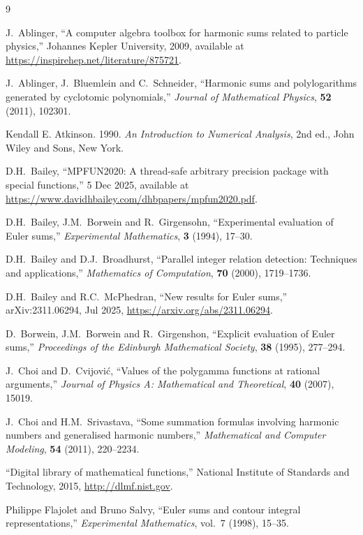 \documentclass{article}
\theoremstyle{definition}
\begin{document}
\begin{thebibliography}{9}

 J.~Ablinger, ``A computer algebra toolbox for harmonic sums related to particle physics,'' Johannes Kepler University, 2009, available at \url{https://inspirehep.net/literature/875721}.

 J.~Ablinger, J.~Bluemlein and C.~Schneider, ``Harmonic sums and polylogarithms generated by cyclotomic polynomials,'' \emph{Journal of Mathematical Physics}, {\bf 52} (2011), 102301.

 Kendall E. Atkinson. 1990. \emph{An Introduction to Numerical Analysis}, 2nd ed., John Wiley and Sons, New York.

D.H.~Bailey, ``MPFUN2020: A thread-safe arbitrary precision package with special functions,'' 5 Dec 2025, available at \url{https://www.davidhbailey.com/dhbpapers/mpfun2020.pdf}.

D.H.~Bailey, J.M.~Borwein and R.~Girgensohn, ``Experimental evaluation of Euler sums,'' \emph{Experimental Mathematics}, {\bf 3} (1994), 17--30.

 D.H.~Bailey and D.J.~Broadhurst, ``Parallel integer relation detection: Techniques and applications,'' \emph{Mathematics of Computation}, {\bf 70} (2000), 1719--1736.

D.H.~Bailey and R.C.~McPhedran, ``New results for Euler sums,'' arXiv:2311.06294, Jul 2025, \url{https://arxiv.org/abs/2311.06294}.

D.~Borwein, J.M.~Borwein and R.~Girgenshon, ``Explicit evaluation of Euler sums,'' {\em Proceedings of the Edinburgh Mathematical Society}, {\bf 38} (1995), 277--294.

J.~Choi and D.~Cvijović, ``Values of the polygamma functions at rational arguments,'' \emph{Journal of Physics A: Mathematical and Theoretical}, {\bf 40} (2007), 15019.

J.~Choi and H.M.~Srivastava, ``Some summation formulas involving harmonic numbers and generalised harmonic numbers,'' \emph{Mathematical and Computer Modeling}, {\bf 54} (2011), 220--2234.

``Digital library of mathematical functions,'' National Institute of Standards and Technology, 2015, \url{http://dlmf.nist.gov}.

Philippe Flajolet and Bruno Salvy, ``Euler sums and contour integral representations,'' \emph{Experimental Mathematics}, vol.~7 (1998), 15--35.


\end{thebibliography}
\end{document}
